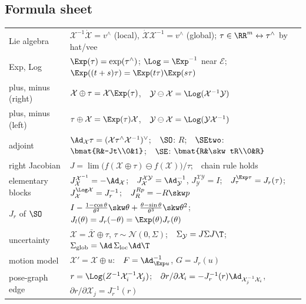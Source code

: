 \subsection{Formula sheet}\label{sec:lie:formula-sheet}

\begin{center}\small
\renewcommand{\arraystretch}{1.3}
\begin{tabularx}{\linewidth}{@{}>{\raggedright\arraybackslash}p{3.3cm}X@{}}\toprule
Lie algebra & $\mathcal X^{-1}\dot{\mathcal X}=v^\wedge$ (local), $\dot{\mathcal X}\mathcal X^{-1}=v^\wedge$ (global); $\tau\in\RR^m\leftrightarrow\tau^\wedge$ by hat/vee\\
Exp, Log & $\Exp(\tau)=\exp(\tau^\wedge)$; $\Log=\Exp^{-1}$ near $\mathcal E$; $\Exp((t+s)\tau)=\Exp(t\tau)\Exp(s\tau)$\\
plus, minus (right) & $\mathcal X\oplus\tau=\mathcal X\Exp(\tau)$,\ \ $\mathcal Y\ominus\mathcal X=\Log(\mathcal X^{-1}\mathcal Y)$\\
plus, minus (left) & $\tau\oplus\mathcal X=\Exp(\tau)\mathcal X$,\ \ $\mathcal Y\ominus\mathcal X=\Log(\mathcal Y\mathcal X^{-1})$\\
adjoint & $\Ad_{\mathcal X}\tau=(\mathcal X\tau^\wedge\mathcal X^{-1})^\vee$;\ \ $\SO$: $R$;\ \ $\SEtwo$: $\bmat{R&-Jt\\0&1}$;\ \ $\SE$: $\bmat{R&\skw tR\\0&R}$\\
right Jacobian & $J=\lim\big(f(\mathcal X\oplus\tau)\ominus f(\mathcal X)\big)/\tau$;\ \ chain rule holds\\
elementary blocks & $J^{\mathcal X^{-1}}_{\mathcal X}=-\Ad_{\mathcal X}$;\ \ $J^{\mathcal X\mathcal Y}_{\mathcal X}=\Ad_{\mathcal Y}^{-1}$, $J^{\mathcal X\mathcal Y}_{\mathcal Y}=I$;\ \ $J^{\Exp\tau}_\tau=J_r(\tau)$;\ \ $J^{\Log\mathcal X}_{\mathcal X}=J_r^{-1}$;\ \ $J^{Rp}_R=-R\skw p$\\
$J_r$ of $\SO$ & $I-\frac{1-\cos\theta}{\theta^2}\skw\theta+\frac{\theta-\sin\theta}{\theta^3}\skw\theta^2$;\ \ $J_l(\theta)=J_r(-\theta)=\Exp(\theta)J_r(\theta)$\\
uncertainty & $\mathcal X=\bar{\mathcal X}\oplus\tau$, $\tau\sim\mathcal N(0,\Sigma)$;\ \ $\Sigma_{\mathcal Y}=J\Sigma J\T$;\ \ $\Sigma_{\text{glob}}=\Ad\,\Sigma_{\text{loc}}\Ad\T$\\
motion model & $\mathcal X'=\mathcal X\oplus u$:\ \ $F=\Ad_{\Exp u}^{-1}$, $G=J_r(u)$\\
pose-graph edge & $r=\Log(Z^{-1}\mathcal X_i^{-1}\mathcal X_j)$;\ \ $\partial r/\partial\mathcal X_i=-J_r^{-1}(r)\Ad_{\mathcal X_j^{-1}\mathcal X_i}$, $\partial r/\partial\mathcal X_j=J_r^{-1}(r)$\\\bottomrule
\end{tabularx}
\end{center}
